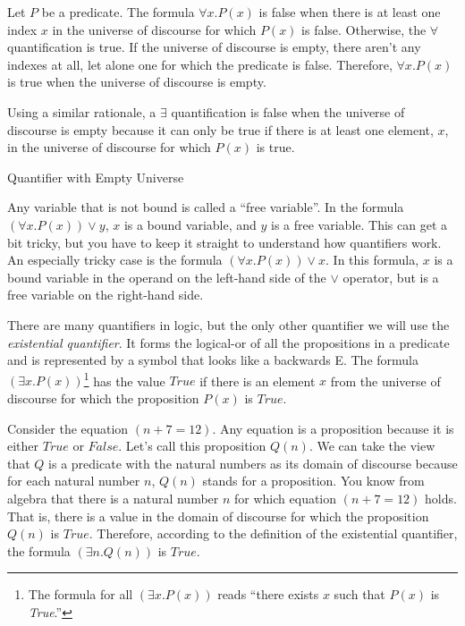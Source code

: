 {{\begin{aside}
Let $P$ be a predicate.
The formula
$\forall x.P(x)$
is false when there is
at least one index $x$ in the universe of discourse
for which $P(x)$ is false.
Otherwise, the $\forall$ quantification is true.
If the universe of discourse is empty,
there aren't any indexes at all,
let alone one for which the predicate is false.
Therefore, $\forall x.P(x)$ is true
when the universe of discourse is empty.

Using a similar rationale, a
$\exists$ quantification
is false when the universe of discourse is empty
because it can only be true if there is
at least one element, $x$, in the universe of discourse
for which $P(x)$ is true.
\caption{Quantifier with Empty Universe}
\label{empty-forall}
\end{aside}

Any variable that is not bound is
called a
\label{def:free-variable}``free variable''.
In the formula $(\forall x.P(x)) \vee y$,
$x$ is a bound variable, and $y$ is a free variable.
This can get a bit tricky, but you have to keep it
straight to understand how quantifiers work.
An especially tricky case is the formula
$(\forall x.P(x)) \vee x$.
In this formula, $x$ is a bound variable in the
operand on the left-hand side of the $\vee$ operator,
but is a free variable on the right-hand side.

There are many quantifiers in logic, but the only other
quantifier we will use the
\label{def:existential-quantifier}\emph{existential quantifier}.
It forms the logical-or of all the propositions in a predicate
and is represented by a symbol that looks like a backwards E.
The  formula $(\exists x.P(x))$\footnote{The
formula for all $(\exists x.P(x))$ reads
``there exists $x$ such that $P(x)$ is \emph{True}.''}
has the value $True$
if there is an element $x$ from the universe of discourse
for which the proposition $P(x)$ is $True$.

Consider the equation $(n + 7 = 12)$.
Any equation is a proposition because it is either
$True$ or $False$. Let's call this proposition $Q(n)$.
We can take the view that $Q$ is a predicate
with the natural numbers as its domain of discourse
because for each natural number $n$,
$Q(n)$ stands for a proposition.
You know from algebra that there is a natural number
$n$ for which equation $(n + 7 = 12)$ holds.
That is, there is a value in the domain
of discourse for which the proposition $Q(n)$ is $True$.
Therefore, according to the definition of the
existential quantifier,
the formula $(\exists n.Q(n))$ is $True$.

}}
